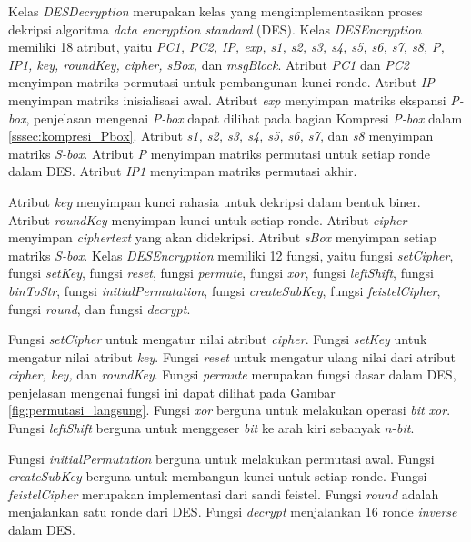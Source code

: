 Kelas \textit{DESDecryption} merupakan kelas yang mengimplementasikan proses dekripsi algoritma \textit{data encryption standard} (DES). Kelas \textit{DESEncryption} memiliki 18 atribut, yaitu \textit{PC1, PC2, IP, exp, s1, s2, s3, s4, s5, s6, s7, s8, P, IP1, key, roundKey, cipher, sBox,} dan \textit{msgBlock}. Atribut \textit{PC1} dan \textit{PC2} menyimpan matriks permutasi untuk pembangunan kunci ronde. Atribut \textit{IP} menyimpan matriks inisialisasi awal. Atribut \textit{exp} menyimpan matriks ekspansi \textit{P-box}, penjelasan mengenai \textit{P-box} dapat dilihat pada bagian Kompresi \textit{P-box} dalam \ref{sssec:kompresi_Pbox}. Atribut \textit{s1, s2, s3, s4, s5, s6, s7,} dan \textit{s8} menyimpan matriks \textit{S-box}. Atribut \textit{P} menyimpan matriks permutasi untuk setiap ronde dalam DES. Atribut \textit{IP1} menyimpan matriks permutasi akhir.

Atribut \textit{key} menyimpan kunci rahasia untuk dekripsi dalam bentuk biner. Atribut \textit{roundKey} menyimpan kunci untuk setiap ronde. Atribut \textit{cipher} menyimpan \textit{ciphertext} yang akan didekripsi. Atribut \textit{sBox} menyimpan setiap matriks \textit{S-box}. Kelas \textit{DESEncryption} memiliki 12 fungsi, yaitu fungsi \textit{setCipher}, fungsi \textit{setKey}, fungsi \textit{reset}, fungsi \textit{permute}, fungsi \textit{xor}, fungsi \textit{leftShift}, fungsi \textit{binToStr}, fungsi \textit{initialPermutation}, fungsi \textit{createSubKey}, fungsi \textit{feistelCipher}, fungsi \textit{round}, dan fungsi \textit{decrypt}.

Fungsi \textit{setCipher} untuk mengatur nilai atribut \textit{cipher}. Fungsi \textit{setKey} untuk mengatur nilai atribut \textit{key}. Fungsi \textit{reset} untuk mengatur ulang nilai dari atribut \textit{cipher, key,} dan \textit{roundKey}. Fungsi \textit{permute} merupakan fungsi dasar dalam DES, penjelasan mengenai fungsi ini dapat dilihat pada Gambar \ref{fig:permutasi_langsung}. Fungsi \textit{xor} berguna untuk melakukan operasi \textit{bit xor}. Fungsi \textit{leftShift} berguna untuk menggeser \textit{bit} ke arah kiri sebanyak \begin{math}n\end{math}-\textit{bit}.

Fungsi \textit{initialPermutation} berguna untuk melakukan permutasi awal. Fungsi \textit{createSubKey} berguna untuk membangun kunci untuk setiap ronde. Fungsi \textit{feistelCipher} merupakan implementasi dari sandi feistel. Fungsi \textit{round} adalah menjalankan satu ronde dari DES. Fungsi \textit{decrypt} menjalankan 16 ronde \textit{inverse} dalam DES.

